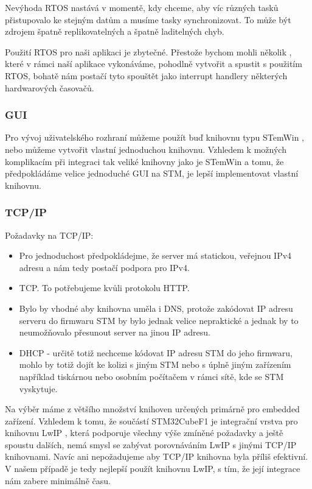 Nevýhoda RTOS nastává v momentě, kdy chceme, aby víc různých tasků přistupovalo ke stejným datům
a musíme tasky synchronizovat.
To může být zdrojem špatně replikovatelných a špatně laditelných chyb.

Použití RTOS pro naši aplikaci je zbytečné.
Přestože bychom mohli několik , které v rámci naší aplikace vykonáváme, pohodlně vytvořit
a spustit s použitím RTOS, bohatě nám postačí tyto  spouštět jako interrupt handlery některých
hardwarových časovačů.

\subsubsection{GUI}
Pro vývoj uživatelského rozhraní můžeme použít buď knihovnu typu STemWin \cite{STemWin}, nebo můžeme
vytvořit vlastní jednoduchou knihovnu.
Vzhledem k možných komplikacím při integraci tak veliké knihovny jako je STemWin a tomu, že
předpokládáme velice jednoduché GUI na STM, je lepší implementovat vlastní knihovnu.

\subsubsection{TCP/IP}
Požadavky na TCP/IP:
\begin{itemize}
  \item Pro jednoduchost předpokládejme, že server má statickou, veřejnou IPv4 adresu a nám tedy
    postačí podpora pro IPv4.
  \item TCP. To potřebujeme kvůli protokolu HTTP.
  \item Bylo by vhodné aby knihovna uměla i DNS, protože zakódovat IP adresu serveru do firmwaru
    STM by bylo jednak velice nepraktické a jednak by to neumožňovalo přesunout server na jinou
    IP adresu.
  \item DHCP - určitě totiž nechceme kódovat IP adresu STM do jeho firmwaru, mohlo by totiž dojít
    ke kolizi s jiným STM nebo s úplně jiným zařízením například tiskárnou nebo osobním počítačem
    v rámci sítě, kde se STM vyskytuje.
\end{itemize}
Na výběr máme z většího množství knihoven určených primárně pro embedded zařízení.
Vzhledem k tomu, že součástí STM32CubeF1 je integrační vrstva pro knihovnu LwIP \cite{LwIP}, která podporuje
všechny výše zmíněné požadavky a ještě spoustu dalších, nemá smysl se zabývat porovnáváním LwIP
s jinými TCP/IP knihovnami.
Navíc ani nepožadujeme aby TCP/IP knihovna byla příliš efektivní.
V našem případě je tedy nejlepší použít knihovnu LwIP, s tím, že její integrace nám zabere minimálně
času.

